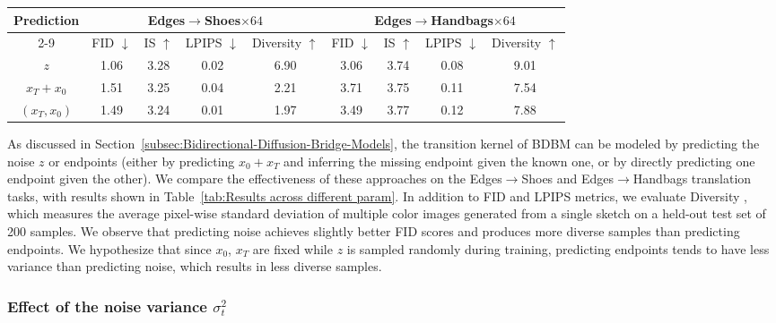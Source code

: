\noindent 
\begin{table*}
\begin{centering}
\begin{tabular}{ccccccccc}
\toprule 
\multirow{2}{*}{Prediction} & \multicolumn{4}{c}{Edges$\rightarrow$Shoes$\times64$} & \multicolumn{4}{c}{Edges$\rightarrow$Handbags$\times64$}\tabularnewline
\cmidrule{2-9} 
 & FID $\downarrow$ & IS $\uparrow$ & LPIPS $\downarrow$ & Diversity $\uparrow$ & FID $\downarrow$ & IS $\uparrow$ & LPIPS $\downarrow$ & Diversity $\uparrow$\tabularnewline
\midrule
\midrule 
$z$ & 1.06 & 3.28 & 0.02 & 6.90 & 3.06 & 3.74 & 0.08 & 9.01\tabularnewline
\midrule 
$x_{T}+x_{0}$ & 1.51 & 3.25 & 0.04 & 2.21 & 3.71 & 3.75 & 0.11 & 7.54\tabularnewline
\midrule 
$\left(x_{T},x_{0}\right)$ & 1.49 & 3.24 & 0.01 & 1.97 & 3.49 & 3.77 & 0.12 & 7.88\tabularnewline
\bottomrule
\end{tabular}
\par\end{centering}
\caption{Results of our method w.r.t. different parameterizations.\label{tab:Results across different param}}
\end{table*}

As discussed in Section~\ref{subsec:Bidirectional-Diffusion-Bridge-Models},
the transition kernel of BDBM can be modeled by predicting the noise
$z$ or endpoints (either by predicting $x_{0}+x_{T}$ and inferring
the missing endpoint given the known one, or by directly predicting
one endpoint given the other). We compare the effectiveness of these
approaches on the Edges$\rightarrow$Shoes and Edges$\rightarrow$Handbags
translation tasks, with results shown in Table~\ref{tab:Results across different param}.
In addition to FID and LPIPS metrics, we evaluate Diversity \cite{batzolis2021conditional,LiX0L23},
which measures the average pixel-wise standard deviation of multiple
color images generated from a single sketch on a held-out test set
of 200 samples. We observe that predicting noise achieves slightly
better FID scores and produces more diverse samples than predicting
endpoints. We hypothesize that since $x_{0}$, $x_{T}$ are fixed
while $z$ is sampled randomly during training, predicting endpoints
tends to have less variance than predicting noise, which results in
less diverse samples.

\subsubsection{Effect of the noise variance $\sigma_{t}^{2}$\label{subsec:noise_variance_ablation}}

